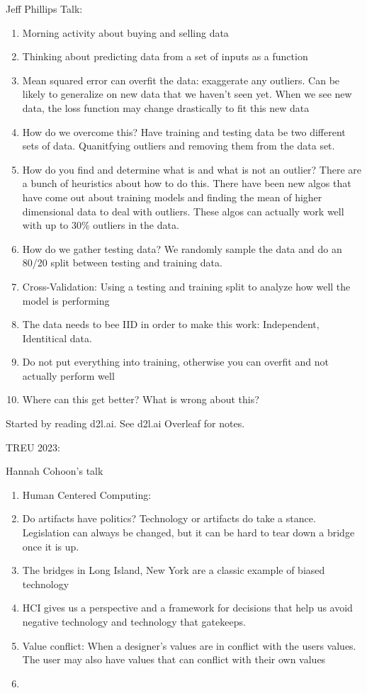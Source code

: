 \documentclass[a4paper, 11pt, oneside]{researchjournal} %
\begin{document}
 Jeff Phillips Talk:
 \begin{enumerate}
     \item Morning activity about buying and selling data
     \item Thinking about predicting data from a set of inputs as a function
     \item Mean squared error can overfit the data: exaggerate any outliers. Can be likely to generalize on new data that we haven't seen yet. When we see new data, the loss function may change drastically to fit this new data
     \item How do we overcome this? Have training and testing data be two different sets of data. Quanitfying outliers and removing them from the data set. 
     \item How do you find and determine what is and what is not an outlier? There are a bunch of heuristics about how to do this. There have been new algos that have come out about training models and finding the mean of higher dimensional data to deal with outliers. These algos can actually work well with up to 30\% outliers in the data.
     \item How do we gather testing data? We randomly sample the data and do an 80/20 split between testing and training data.
     \item Cross-Validation: Using a testing and training split to analyze how well the model is performing
     \item The data needs to bee IID in order to make this work: Independent, Identitical data. 
     \item Do not put everything into training, otherwise you can overfit and not actually perform well
     \item Where can this get better? What is wrong about this?
 \end{enumerate}
 Started by reading d2l.ai. See d2l.ai Overleaf for notes. 

 TREU 2023:

 Hannah Cohoon's talk
 \begin{enumerate}
     \item Human Centered Computing:
     \item Do artifacts have politics? Technology or artifacts do take a stance. Legislation can always be changed, but it can be hard to tear down a bridge once it is up. 
     \item The bridges in Long Island, New York are a classic example of biased technology
     \item HCI gives us a perspective and a framework for decisions that help us avoid negative technology and technology that gatekeeps. 
     \item Value conflict: When a designer's values are in conflict with the users values. The user may also have values that can conflict with their own values
     \item 
 \end{enumerate}
\end{document}
